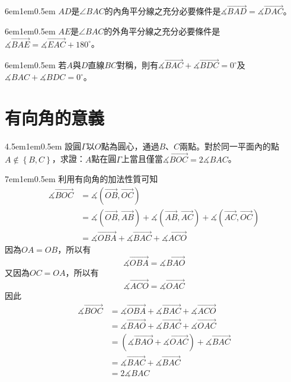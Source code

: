 \documentclass[12pt]{article}
\begin{document}
\begin{mybox}[內角平分線]{6em}{1em}{0.5em}
    $AD$是$\angle{BAC}$的內角平分線之充分必要條件是$\measuredangle{\overrightarrow{BAD}}=\measuredangle{\overrightarrow{DAC}}$。
\end{mybox}
\begin{mybox}[外角平分線]{6em}{1em}{0.5em}
    $AE$是$\angle{BAC}$的外角平分線之充分必要條件是$\measuredangle{\overrightarrow{BAE}}=\measuredangle{\overrightarrow{EAC}}+180^{\circ}$。
\end{mybox}
\begin{mybox}[軸對稱]{6em}{1em}{0.5em}
    若$A$與$D$直線$BC$對稱，則有$\measuredangle{\overrightarrow{BAC}}+\measuredangle{\overrightarrow{BDC}}=0^{\circ}$及$\measuredangle{BAC}+\measuredangle{BDC}=0^{\circ}$。
\end{mybox}
\section{有向角的意義}
\begin{mybox}[例題1]{4.5em}{1em}{0.5em}
    設圓$\Gamma$以$O$點為圓心，通過$B$、$C$兩點。對於同一平面內的點$A\notin\left\{B,C\right\}$，求證：$A$點在圓$\Gamma$上當且僅當$\measuredangle{\overrightarrow{BOC}}=2\measuredangle{BAC}$。
\end{mybox}
\begin{mybox}[充分性證明]{7em}{1em}{0.5em}
    利用有向角的加法性質可知
    \begin{align*}
        \measuredangle{\overrightarrow{BOC}}&=\measuredangle{\left(\overrightarrow{OB},\overrightarrow{OC}\right)}\\
        &=\measuredangle{\left(\overrightarrow{OB},\overrightarrow{AB}\right)}
        +\measuredangle{\left(\overrightarrow{AB},\overrightarrow{AC}\right)}
        +\measuredangle{\left(\overrightarrow{AC},\overrightarrow{OC}\right)}\\
        &=\measuredangle{\overrightarrow{OBA}}+\measuredangle{\overrightarrow{BAC}}+\measuredangle{\overrightarrow{ACO}}
    \end{align*}
    因為$OA=OB$，所以有
    $$
        \measuredangle{\overrightarrow{OBA}}=\measuredangle{\overrightarrow{BAO}}
    $$
    又因為$OC=OA$，所以有
    $$
        \measuredangle{\overrightarrow{ACO}}=\measuredangle{\overrightarrow{OAC}}
    $$
    因此
    \begin{align*}
        \measuredangle{\overrightarrow{BOC}}&=\measuredangle{\overrightarrow{OBA}}+\measuredangle{\overrightarrow{BAC}}+\measuredangle{\overrightarrow{ACO}}\\
        &=\measuredangle{\overrightarrow{BAO}}+\measuredangle{\overrightarrow{BAC}}+\measuredangle{\overrightarrow{OAC}}\\
        &=\left(\measuredangle{\overrightarrow{BAO}}+\measuredangle{\overrightarrow{OAC}}\right)+\measuredangle{\overrightarrow{BAC}}\\
        &=\measuredangle{\overrightarrow{BAC}}+\measuredangle{\overrightarrow{BAC}}\\
        &=2\measuredangle{BAC}
    \end{align*}
\end{mybox}
\end{document}
